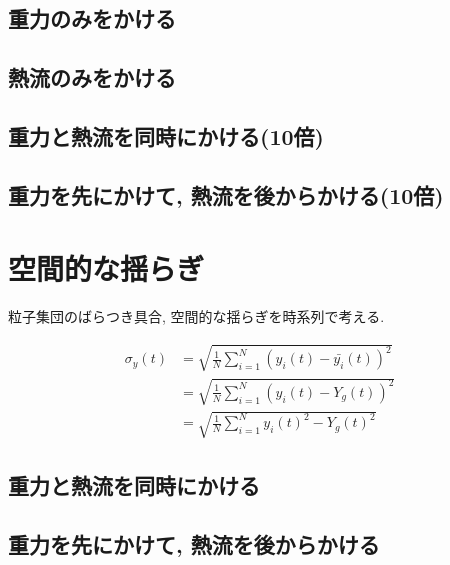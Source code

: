 

\subsection{重力のみをかける}



\subsection{熱流のみをかける}



\subsection{重力と熱流を同時にかける(10倍)}



\subsection{重力を先にかけて, 熱流を後からかける(10倍)}



\section{空間的な揺らぎ}

粒子集団のばらつき具合, 空間的な揺らぎを時系列で考える.

\begin{align}
  \sigma_{y} (t)
  &= \sqrt{\frac{1}{N} \sum_{i=1}^{N} (y_i (t) - \bar{y_i}(t) )^2} \\
  &= \sqrt{\frac{1}{N} \sum_{i=1}^{N} (y_i (t) - Y_g (t) )^2} \\
  &= \sqrt{\frac{1}{N} \sum_{i=1}^{N} {{y_i} (t)}^2 - {{Y_g} (t)}^2}
\end{align}

\subsection{重力と熱流を同時にかける}



\subsection{重力を先にかけて, 熱流を後からかける}

